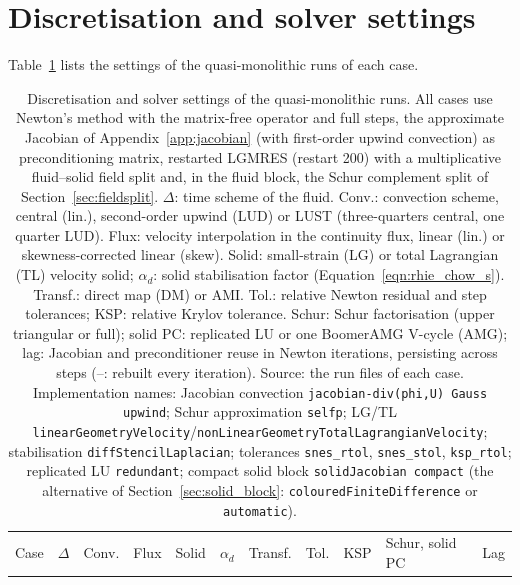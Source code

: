 \section{Discretisation and solver settings}\label{app:settings}

Table~\ref{tab:solver_settings} lists the settings of the quasi-monolithic runs of each case.

\begin{table}[htbp]
	\centering
	\footnotesize
	\setlength{\tabcolsep}{2pt}
	\caption{Discretisation and solver settings of the quasi-monolithic runs.
	All cases use Newton's method with the matrix-free operator and full steps, the approximate Jacobian of Appendix~\ref{app:jacobian} (with first-order upwind convection) as preconditioning matrix, restarted LGMRES (restart 200) with a multiplicative fluid--solid field split and, in the fluid block, the Schur complement split of Section~\ref{sec:fieldsplit}.
	$\Delta$: time scheme of the fluid.
	Conv.: convection scheme, central (lin.), second-order upwind (LUD) or LUST (three-quarters central, one quarter LUD).
	Flux: velocity interpolation in the continuity flux, linear (lin.) or skewness-corrected linear (skew).
	Solid: small-strain (LG) or total Lagrangian (TL) velocity solid; $\alpha_d$: solid stabilisation factor (Equation~\eqref{eqn:rhie_chow_s}).
	Transf.: direct map (DM) or AMI.
	Tol.: relative Newton residual and step tolerances; KSP: relative Krylov tolerance.
	Schur: Schur factorisation (upper triangular or full); solid PC: replicated LU or one BoomerAMG V-cycle (AMG); lag: Jacobian and preconditioner reuse in Newton iterations, persisting across steps (--: rebuilt every iteration).
	Source: the run files of each case.
	Implementation names: Jacobian convection \texttt{jacobian-div(phi,U) Gauss upwind}; Schur approximation \texttt{selfp}; LG/TL \texttt{linearGeometryVelocity}/\texttt{nonLinearGeometryTotalLagrangianVelocity}; stabilisation \texttt{diffStencilLaplacian}; tolerances \texttt{snes\_rtol}, \texttt{snes\_stol}, \texttt{ksp\_rtol}; replicated LU \texttt{redundant}; compact solid block \texttt{solidJacobian compact} (the alternative of Section~\ref{sec:solid_block}: \texttt{colouredFiniteDifference} or \texttt{automatic}).}
	\label{tab:solver_settings}
	\begin{tabular}{lllllllllll}
		\toprule
		Case & $\Delta$ & Conv. & Flux & Solid & $\alpha_d$ & Transf. & Tol. & KSP & Schur, solid PC & Lag \\

\end{tabular}
\end{table}
